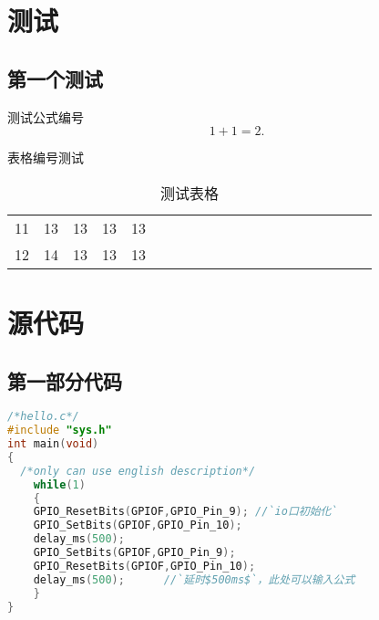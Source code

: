 \documentclass[forprint]{CSUBachelor}
\begin{document}
\appendix

\chapter{测试}

\section{第一个测试}
测试公式编号
\begin{equation}
1+1=2.
\end{equation}

表格编号测试

\begin{table}[h]
  \centering
  \caption{测试表格}
  \begin{tabular}{*{20}c}
     \hline
     11 & 13  & 13  & 13  & 13 \\
     12 & 14  & 13  & 13  & 13 \\
     \hline
   \end{tabular}
\end{table}


\chapter{源代码}

\section{第一部分代码}

\lstset{columns=flexable,numbers=left,numberstyle=\footnotesize,escapechar=`,xleftmargin=2em,xrightmargin=2em, aboveskip=0em}

\begin{spacing}{1}
\begin{lstlisting}[language=C]
/*hello.c*/
#include "sys.h"
int main(void)
{ 
  /*only can use english description*/
	while(1)
	{
	GPIO_ResetBits(GPIOF,GPIO_Pin_9); //`io口初始化`
	GPIO_SetBits(GPIOF,GPIO_Pin_10); 
	delay_ms(500); 
	GPIO_SetBits(GPIOF,GPIO_Pin_9);
	GPIO_ResetBits(GPIOF,GPIO_Pin_10);
	delay_ms(500); 		//`延时$500ms$`，此处可以输入公式
	}	  
}
\end{lstlisting}
\end{spacing}

\cleardoublepage	%
\end{document}
